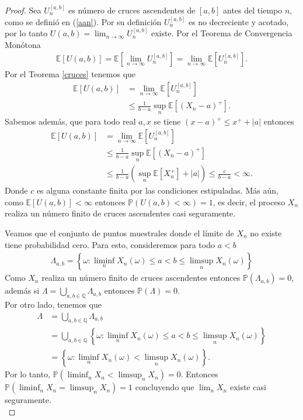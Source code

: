 \begin{proof}
Sea $U_n^{[a, b]}$ es número de cruces ascendentes de $[a, b]$ antes del tiempo $n$, como se definió en (\ref{aan}). Por su definición $U_n^{[a, b]}$ es no decreciente y acotado, por lo tanto $U(a, b) = \lim_{n \rightarrow \infty} U_n^{[a, b]}$ existe. Por el Teorema de Convergencia Monótona
	\begin{align*}
	\mathbb{E}[U(a, b)] = \mathbb{E}\left[\lim_{n \rightarrow \infty} U_n^{[a, b]}\right] = \lim_{n \rightarrow \infty} \mathbb{E}[U_n^{[a, b]}].
	\end{align*}
Por el Teorema \ref{cruces} tenemos que 
	\begin{align*}
	\mathbb{E}[U(a, b)] & = \lim_{n \rightarrow \infty} \mathbb{E}[U_n^{[a, b]}] \\
	& \leq \frac{1}{b - a} \sup_n \mathbb{E}[(X_n - a)^{+}].
	\end{align*}
Sabemos además, que para todo real $a, x$ se tiene $(x-a)^{+} \leq x^{+} + |a|$ entonces
	\begin{align*}
	\mathbb{E}[U(a, b)] & = \lim_{n \rightarrow \infty} \mathbb{E}[U_n^{[a, b]}] \\
	& \leq \frac{1}{b - a} \sup_n \mathbb{E}[(X_n - a)^{+}] \\
	& \leq \frac{1}{b - a} \left( \sup_n \mathbb{E}[X_n^{+}] + |a| \right) \leq \frac{c}{b-a} < \infty.
	\end{align*}
Donde $c$ es alguna constante  finita por las condiciones estipuladas. Más aún, como $\mathbb{E}[U(a, b)] < \infty$ entonces $\mathbb{P}(U(a, b) < \infty) = 1$, es decir, el proceso $X_n$ realiza un número finito de cruces ascendentes casi seguramente.

Veamos que el conjunto de puntos muestrales donde el límite de $X_n$ no existe tiene probabilidad cero. Para esto, consideremos para todo $a < b$
	\begin{align*}
	\Lambda_{a, b} = \left\{ \omega : \liminf_n X_n(\omega) \leq a < b \leq  \limsup_n X_n(\omega) \right\}
	\end{align*}
Como $X_n$ realiza un número finito de cruces ascendentes entonces $\mathbb{P}(\Lambda_{a, b}) = 0$, además si $\Lambda = \bigcup_{a, b \in \mathbb{Q}} \Lambda_{a, b}$ entonces $\mathbb{P}(\Lambda) = 0$. \\

Por otro lado, tenemos que 
	\begin{align*}
	\Lambda & = \bigcup_{{a, b} \in \mathbb{Q}} \Lambda_{a, b} \\
	& = \bigcup_{{a, b} \in \mathbb{Q}} \left\{ \omega : \liminf_n X_n(\omega) \leq a < b \leq  \limsup_n X_n(\omega) \right\} \\
	& = \left\{ \omega : \liminf_n X_n(\omega) < \limsup_n X_n(\omega) \right\}.
	\end{align*}
Por lo tanto, $\mathbb{P}(\liminf_n X_n < \limsup_n X_n ) = 0$. Entonces $\mathbb{P}(\liminf_n X_n = \limsup_n X_n ) = 1$ concluyendo que $\lim_n X_n$ existe casi seguramente. \\


\end{proof}
